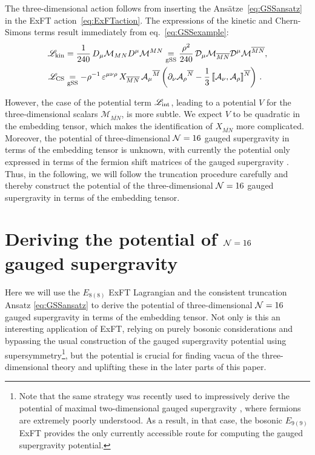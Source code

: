 \documentclass[a4paper, 11pt]{article}
\numberwithin{equation}{section}
\newcommand{\ov}[1]{\overline{#1}}
\newcommand{\EE}{\ensuremath{E_{8(8)}}\xspace}
\newcommand{\En}[1]{E_{#1(#1)}}
\newcommand{\+}{\oplus}
\newcommand{\fl}[1]{\ov{#1}}
\newcommand{\M}{\ensuremath{\mathcal{M}}\xspace}
\newcommand{\A}{\ensuremath{\mathcal{A}}\xspace}
\begin{document}
The three-dimensional action follows from inserting the Ansätze~\eqref{eq:GSSansatz} in the ExFT action~\eqref{eq:ExFTaction}. The expressions of the kinetic and Chern-Simons terms result immediately from eq.~\eqref{eq:GSSexample}:
\begin{equation}
	\begin{split}
		\mathscr{L}_{\rm kin} &= \frac{1}{240}\,D_{\mu}\M_{MN}D^{\mu}\M^{MN} \underset{\rm gSS}{=} \frac{\rho^{2}}{240}\,{\cal D}_{\mu}\M_{\fl{MN}}{\cal D}^{\mu}\M^{\fl{MN}}, \\
		\mathscr{L}_{\rm CS} &\underset{\rm gSS}{=} -\rho^{-1}\,\varepsilon^{\mu\nu\rho}\,X_{\fl{MN}}\,\A_{\mu}{}^{\fl{M}} \left(\partial_{\nu}\A_{\rho}{}^{\fl{N}}-\frac{1}{3}\,\llbracket\A_{\nu},\A_{\rho}\rrbracket^{\fl{N}}\right)\,.
	\end{split}
\end{equation}

However, the case of the potential term $\mathscr{L}_{\rm int}$, leading to a potential $V$ for the three-dimensional scalars $\M_{\fl{MN}}$, is more subtle. We expect $V$ to be quadratic in the embedding tensor, which makes the identification of $X_{\fl{MN}}$ more complicated. Moreover, the potential of three-dimensional ${\cal N}=16$ gauged supergravity in terms of the embedding tensor is unknown, with currently the potential only expressed in terms of the fermion shift matrices of the gauged supergravity \cite{Nicolai:2000sc,Nicolai:2001sv}. Thus, in the following, we will follow the truncation procedure carefully and thereby construct the potential of the three-dimensional ${\cal N}=16$ gauged supergravity in terms of the embedding tensor.

\section{Deriving the potential of ${\cal N}=16$ gauged supergravity} \label{s:Potential}
Here we will use the $\EE$ ExFT Lagrangian and the consistent truncation Ansatz \eqref{eq:GSSansatz} to derive the potential of three-dimensional ${\cal N}=16$ gauged supergravity \cite{Nicolai:2000sc,Nicolai:2001sv} in terms of the embedding tensor. Not only is this an interesting application of ExFT, relying on purely bosonic considerations and bypassing the usual construction of the gauged supergravity potential using supersymmetry\footnote{Note that the same strategy was recently used to impressively derive the potential of maximal two-dimensional gauged supergravity \cite{Bossard:2022wvi}, where fermions are extremely poorly understood. As a result, in that case, the bosonic $\En{9}$ ExFT \cite{Bossard:2018utw,Bossard:2021jix} provides the only currently accessible route for computing the gauged supergravity potential.}, but the potential is crucial for finding vacua of the three-dimensional theory and uplifting these in the later parts of this paper. 
\end{document}
